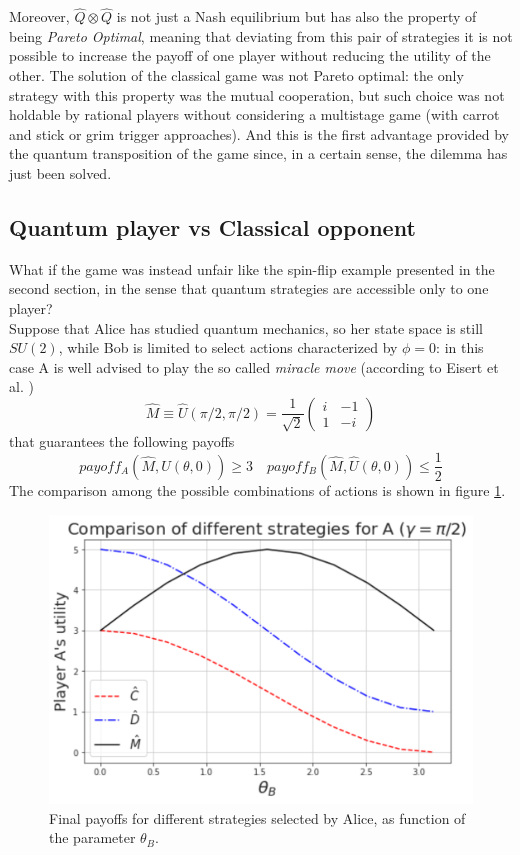 Moreover, $\hat{Q}\otimes\hat{Q}$ is not just a Nash equilibrium but has also the property of being \textit{Pareto Optimal}, meaning that deviating from this pair of strategies it is not possible to increase the payoff of one player
without reducing the utility of the other. The solution of the classical game was not Pareto optimal: the only strategy with this property was the mutual cooperation, but such choice was not holdable by rational players without considering a multistage game (with carrot and stick or grim trigger approaches). And this is the first advantage provided by the quantum transposition of the game since, in a certain sense, the dilemma has just been solved.\\

\subsection{Quantum player vs Classical opponent}
What if the game was instead unfair like the spin-flip example presented in the second section, in the sense that quantum strategies are accessible only to one player?\\
Suppose that Alice has studied quantum mechanics, so her state space is still $SU(2)$, while Bob is limited to select actions characterized by $\phi=0$: in this case A is well advised to play the so called \textit{miracle move} (according to Eisert et al. \cite{Eisert_2020})
\[ \hat{M}\equiv\hat{U}(\pi/2,\pi/2)=\frac{1}{\sqrt{2}}\begin{pmatrix} i&-1\\1&-i \end{pmatrix}  \]
that guarantees the following payoffs
\[ payoff_A\left(\hat{M},\hat{U}(\theta,0)\right) \geq 3 \quad payoff_B\left(\hat{M},\hat{U}(\theta,0)\right) \leq \frac{1}{2}  \]
The comparison among the possible combinations of actions is shown in figure \ref{fig:quantumvsclassical}.\\

\begin{figure}[!ht]
	\centering
	\includegraphics[scale=0.4]{pictures/PD_quantumvsclassical.pdf}
	\caption{Final payoffs for different strategies selected by Alice, as function of the parameter $\theta_B$.}
	\label{fig:quantumvsclassical}
\end{figure}

